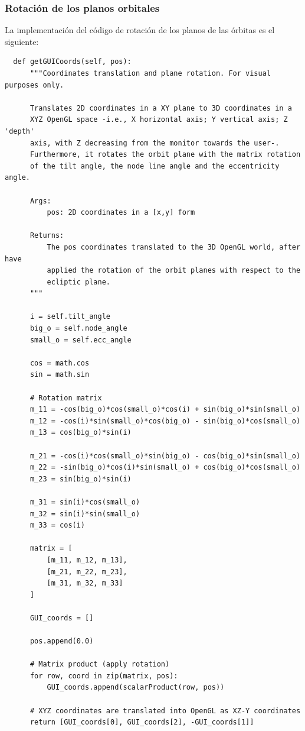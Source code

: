 \documentclass[a4paper, 11pt]{article}
\begin{document}
  \subsubsection{Rotación de los planos orbitales}

  La implementación del código de rotación de los planos de las órbitas es el siguiente:

  \begin{lstlisting}
  def getGUICoords(self, pos):
      """Coordinates translation and plane rotation. For visual purposes only.

      Translates 2D coordinates in a XY plane to 3D coordinates in a
      XYZ OpenGL space -i.e., X horizontal axis; Y vertical axis; Z 'depth'
      axis, with Z decreasing from the monitor towards the user-.
      Furthermore, it rotates the orbit plane with the matrix rotation
      of the tilt angle, the node line angle and the eccentricity angle.

      Args:
          pos: 2D coordinates in a [x,y] form

      Returns:
          The pos coordinates translated to the 3D OpenGL world, after have
          applied the rotation of the orbit planes with respect to the
          ecliptic plane.
      """

      i = self.tilt_angle
      big_o = self.node_angle
      small_o = self.ecc_angle

      cos = math.cos
      sin = math.sin

      # Rotation matrix
      m_11 = -cos(big_o)*cos(small_o)*cos(i) + sin(big_o)*sin(small_o)
      m_12 = -cos(i)*sin(small_o)*cos(big_o) - sin(big_o)*cos(small_o)
      m_13 = cos(big_o)*sin(i)

      m_21 = -cos(i)*cos(small_o)*sin(big_o) - cos(big_o)*sin(small_o)
      m_22 = -sin(big_o)*cos(i)*sin(small_o) + cos(big_o)*cos(small_o)
      m_23 = sin(big_o)*sin(i)

      m_31 = sin(i)*cos(small_o)
      m_32 = sin(i)*sin(small_o)
      m_33 = cos(i)

      matrix = [
          [m_11, m_12, m_13],
          [m_21, m_22, m_23],
          [m_31, m_32, m_33]
      ]

      GUI_coords = []

      pos.append(0.0)

      # Matrix product (apply rotation)
      for row, coord in zip(matrix, pos):
          GUI_coords.append(scalarProduct(row, pos))

      # XYZ coordinates are translated into OpenGL as XZ-Y coordinates
      return [GUI_coords[0], GUI_coords[2], -GUI_coords[1]]
  \end{lstlisting}
\end{document}
